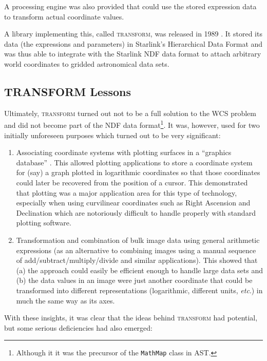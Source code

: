 \documentclass[final,authoryear,5p,times,twocolumn]{elsarticle}
\begin{document}
A processing engine was also provided that could use the stored
expression data to transform actual coordinate values.

A library implementing this, called \textsc{transform}, was released
in 1989 \citep{SUN61,1989StarB...4....7L}. It stored its data (the
expressions and parameters) in Starlink's Hierarchical Data Format
\citep[HDS;][]{SUN92,SSN27,2015HDS} and was thus able to integrate with the
Starlink NDF data format to attach arbitrary world coordinates to
gridded astronomical data sets.


\subsection{TRANSFORM Lessons}

Ultimately, \textsc{transform} turned out not to be a full solution to
the WCS problem and did not become part of the NDF data
format\footnote{Although it it was the precursor of the
  \texttt{MathMap} class in AST.}. It was, however, used for two
initially unforeseen purposes which turned out to be very significant:

\begin{enumerate}
\item Associating coordinate systems with plotting surfaces in a
  ``graphics database'' \citep[see \emph{e.g.},][]{SUN48}. This allowed
  plotting applications to store a coordinate system for (say) a graph
  plotted in logarithmic coordinates so that those coordinates could
  later be recovered from the position of a cursor. This demonstrated
  that plotting was a major application area for this type of
  technology, especially when using curvilinear coordinates such as
  Right Ascension and Declination which are notoriously difficult to
  handle properly with standard plotting software.

\item Transformation and combination of bulk image data using general
  arithmetic expressions (as an alternative to combining images using
  a manual sequence of add/subtract/multiply/divide and similar
  applications). This showed that (a) the approach could easily be
  efficient enough to handle large data sets and (b) the data values in
  an image were just another coordinate that could be transformed into
  different representations (logarithmic, different units, \emph{etc}.) in
  much the same way as its axes.
\end{enumerate}

With these insights, it was clear that the ideas behind
\textsc{transform} had potential, but some serious deficiencies had
also emerged:
\end{document}
